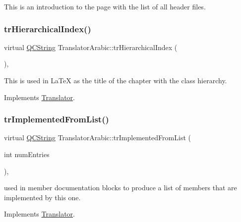 This is an introduction to the page with the list of all header files. \mbox{\label{class_translator_arabic_a7da261a6bc8035969e40c01fe4ea85d7}} 
\subsubsection{\texorpdfstring{trHierarchicalIndex()}{trHierarchicalIndex()}}
{\footnotesize\ttfamily virtual \mbox{\hyperlink{class_q_c_string}{Q\+C\+String}} Translator\+Arabic\+::tr\+Hierarchical\+Index (\begin{DoxyParamCaption}{ }\end{DoxyParamCaption})\hspace{0.3cm}{\ttfamily [inline]}, {\ttfamily [virtual]}}

This is used in La\+TeX as the title of the chapter with the class hierarchy. 

Implements \mbox{\hyperlink{class_translator}{Translator}}.

\mbox{\label{class_translator_arabic_ac98762581291eb3f4d940af089e38d91}} 
\subsubsection{\texorpdfstring{trImplementedFromList()}{trImplementedFromList()}}
{\footnotesize\ttfamily virtual \mbox{\hyperlink{class_q_c_string}{Q\+C\+String}} Translator\+Arabic\+::tr\+Implemented\+From\+List (\begin{DoxyParamCaption}\item[{int}]{num\+Entries }\end{DoxyParamCaption})\hspace{0.3cm}{\ttfamily [inline]}, {\ttfamily [virtual]}}

used in member documentation blocks to produce a list of members that are implemented by this one. 

Implements \mbox{\hyperlink{class_translator}{Translator}}.

\mbox{\label{class_translator_arabic_a38d315ad4f381c2049d2607aaba3a829}} 
